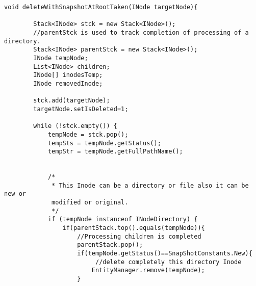\begin{enumerate}
%            


\begin{verbatim}
void deleteWithSnapshotAtRootTaken(INode targetNode){

        Stack<INode> stck = new Stack<INode>();
        //parentStck is used to track completion of processing of a directory.
        Stack<INode> parentStck = new Stack<INode>();
        INode tempNode;
        List<INode> children;
        INode[] inodesTemp;
        INode removedInode;

        stck.add(targetNode);
        targetNode.setIsDeleted=1;   
         
        while (!stck.empty()) {
            tempNode = stck.pop();
            tempSts = tempNode.getStatus();
            tempStr = tempNode.getFullPathName();
           
            
            /*
             * This Inode can be a directory or file also it can be new or 
             modified or original.
             */
            if (tempNode instanceof INodeDirectory) {
                if(parentStack.top().equals(tempNode)){
                    //Processing children is completed
                    parentStack.pop();
                    if(tempNode.getStatus()==SnapShotConstants.New){
                         //delete completely this directory Inode
                        EntityManager.remove(tempNode);
                    }                
                

\end{verbatim}
\end{enumerate}
